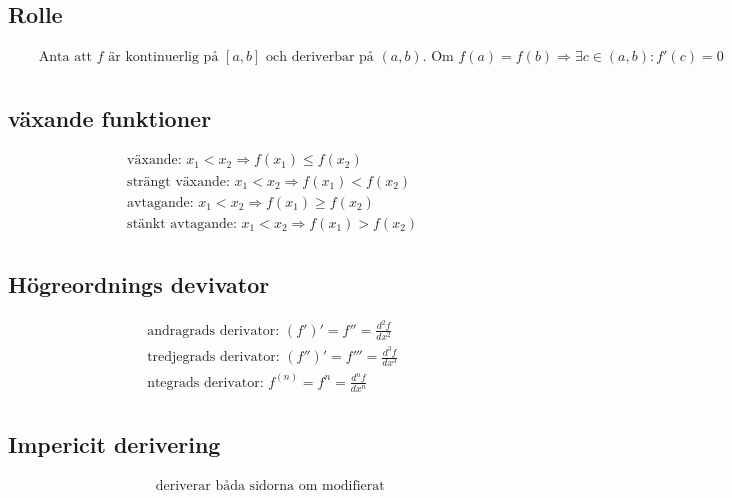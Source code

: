 \subsection{Rolle} 
\begin{align*}
  &\quad  \text{Anta att $f$ är kontinuerlig på $[a,b]$ och deriverbar på $(a,b)$. Om } f(a)=f(b) \Rightarrow
  \exists c \in (a,b):f'(c)=0 \\
\end{align*}


\newpage


\subsection{växande funktioner}
\begin{align*}
  &\quad  \text{växande: }          x_1<x_2 \Rightarrow f(x_1) \leq f(x_2) \\
  &\quad  \text{strängt växande: }   x_1<x_2 \Rightarrow f(x_1) < f(x_2)    \\
  &\quad  \text{avtagande: }        x_1<x_2 \Rightarrow f(x_1) \geq f(x_2) \\
  &\quad  \text{stänkt avtagande: } x_1<x_2 \Rightarrow f(x_1) > f(x_2)    \\
\end{align*}


\subsection{Högreordnings devivator}
\begin{align*}
  &\quad  \text{andragrads derivator: }  (f')' = f''  =\frac{d^2f}{dx^2} \\
  &\quad  \text{tredjegrads derivator: } (f'')'= f''' =\frac{d^3f}{dx^3} \\
  &\quad  \text{ntegrads derivator: }    f^{(n)}= f^{n}=\frac{d^{n}f}{dx^{n}} \\
\end{align*}


\subsection{Impericit derivering}
\begin{align*}
  &\quad  \text{deriverar båda sidorna om modifierat } \\
\end{align*}

